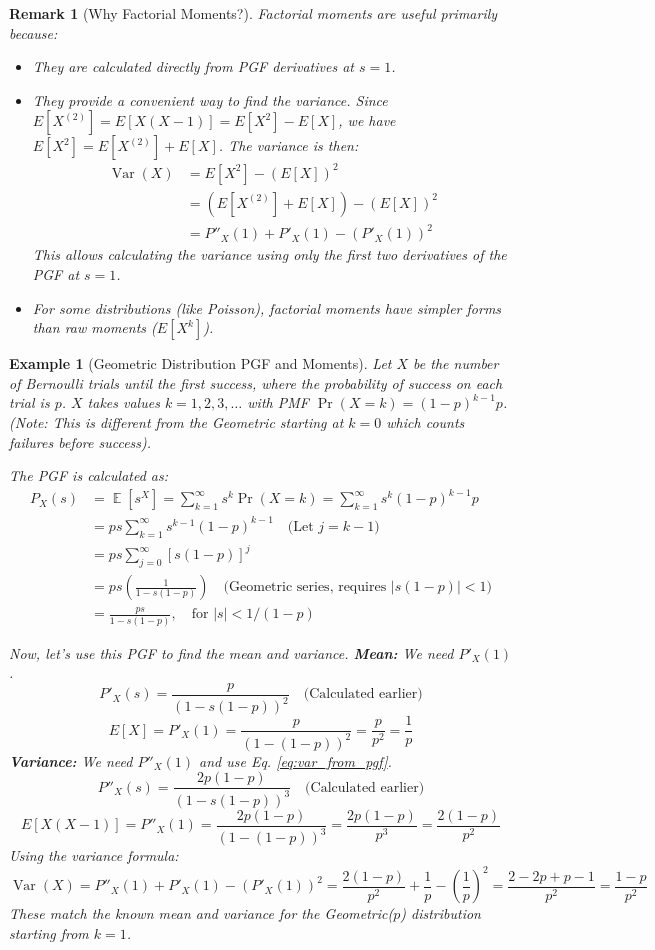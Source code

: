 \documentclass[11pt, letterpaper]{article}
\newtheorem{remark}[theorem]{Remark}
\newtheorem{example}[theorem]{Example}
\DeclareMathOperator{\E}{\mathbb{E}}
\DeclareMathOperator{\Var}{\operatorname{Var}}
\begin{document}
\begin{remark}[Why Factorial Moments?]
Factorial moments are useful primarily because:
\begin{itemize}
    \item They are calculated directly from PGF derivatives at $s=1$.
    \item They provide a convenient way to find the variance. Since $E[X^{(2)}] = E[X(X-1)] = E[X^2] - E[X]$, we have $E[X^2] = E[X^{(2)}] + E[X]$. The variance is then:
        \begin{align}
        \Var(X) &= E[X^2] - (E[X])^2 \nonumber \\
                &= (E[X^{(2)}] + E[X]) - (E[X])^2 \nonumber \\
                &= P''_X(1) + P'_X(1) - (P'_X(1))^2 \label{eq:var_from_pgf}
        \end{align}
        This allows calculating the variance using only the first two derivatives of the PGF at $s=1$.
    \item For some distributions (like Poisson), factorial moments have simpler forms than raw moments ($E[X^k]$).
\end{itemize}
\end{remark}

\begin{example}[Geometric Distribution PGF and Moments]
Let $X$ be the number of Bernoulli trials until the first success, where the probability of success on each trial is $p$. $X$ takes values $k=1, 2, 3, \dots$ with PMF $\Pr(X=k) = (1-p)^{k-1}p$.
\emph{(Note: This is different from the Geometric starting at $k=0$ which counts failures before success).}

The PGF is calculated as:
\begin{align*}
P_X(s) &= \E[s^X] = \sum_{k=1}^{\infty} s^k \Pr(X=k) = \sum_{k=1}^{\infty} s^k (1-p)^{k-1} p \\
       &= p s \sum_{k=1}^{\infty} s^{k-1} (1-p)^{k-1} \quad \text{(Let } j=k-1 \text{)} \\
       &= p s \sum_{j=0}^{\infty} [s(1-p)]^j \\
       &= ps \left( \frac{1}{1 - s(1-p)} \right) \quad \text{(Geometric series, requires } |s(1-p)| < 1) \\
       &= \frac{ps}{1 - s(1-p)}, \quad \text{for } |s| < 1/(1-p)
\end{align*}

Now, let's use this PGF to find the mean and variance.
\textbf{Mean:} We need $P'_X(1)$.
$$ P'_X(s) = \frac{p}{(1-s(1-p))^2} \quad \text{(Calculated earlier)} $$
$$ E[X] = P'_X(1) = \frac{p}{(1-(1-p))^2} = \frac{p}{p^2} = \boxed{\frac{1}{p}} $$
\textbf{Variance:} We need $P''_X(1)$ and use Eq. \eqref{eq:var_from_pgf}.
$$ P''_X(s) = \frac{2p(1-p)}{(1-s(1-p))^3} \quad \text{(Calculated earlier)} $$
$$ E[X(X-1)] = P''_X(1) = \frac{2p(1-p)}{(1-(1-p))^3} = \frac{2p(1-p)}{p^3} = \frac{2(1-p)}{p^2} $$
Using the variance formula:
$$ \Var(X) = P''_X(1) + P'_X(1) - (P'_X(1))^2 = \frac{2(1-p)}{p^2} + \frac{1}{p} - \left(\frac{1}{p}\right)^2 = \frac{2-2p + p - 1}{p^2} = \boxed{\frac{1-p}{p^2}} $$
These match the known mean and variance for the Geometric($p$) distribution starting from $k=1$.
\end{example}
\end{document}
